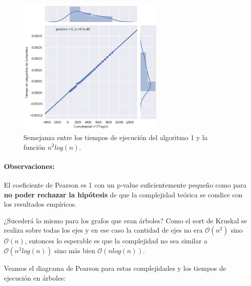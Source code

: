 \documentclass[a4paper]{report}
\begin{document}
\begin{figure}[h!]
    \centering
    \includegraphics[width=0.65\textwidth]{pearsonCompleteN2LOGN.png}
    \caption{Semejanza entre los tiempos de ejecución del algoritmo 1 y la función $n^2 log(n)$.}
    \label{fig:pearsonN2logN}
\end{figure}

\paragraph{Observaciones:} El coeficiente de Pearson es 1 con un p-value suficientemente pequeño como para \textbf{no poder rechazar la hipótesis} de que la complejidad teórica se condice con los resultados empíricos.

\medskip

¿Sucederá lo mismo para los grafos que eran árboles? Como el sort de Kruskal se realiza sobre todas los ejes y en ese caso la cantidad de ejes no era $\mathcal{O}(n^2)$ sino $\mathcal{O}(n)$, entonces lo esperable es que la complejidad no sea similar a $\mathcal{O}(n^2log(n))$ sino más bien $\mathcal{O}(nlog(n))$.

Veamos el diagrama de Pearson para estas complejidades y los tiempos de ejecución en árboles:
\end{document}
